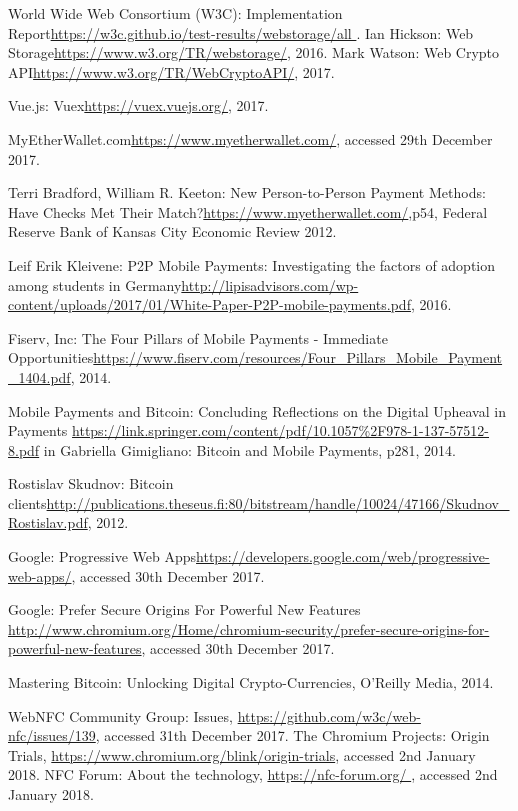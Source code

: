 \begin{thebibliography}{99}
 World Wide Web Consortium (W3C): Implementation Report\url{https://w3c.github.io/test-results/webstorage/all
}.
 Ian Hickson: Web Storage\url{https://www.w3.org/TR/webstorage/}, 2016.
 Mark Watson: Web Crypto API\url{https://www.w3.org/TR/WebCryptoAPI/}, 2017.

 Vue.js: Vuex\url{https://vuex.vuejs.org/}, 2017.

 MyEtherWallet.com\url{https://www.myetherwallet.com/}, accessed 29th December 2017.

 Terri Bradford, William R. Keeton: New Person-to-Person
Payment Methods: Have Checks Met Their Match?\url{https://www.myetherwallet.com/},p54, Federal Reserve Bank of Kansas City Economic Review 2012.

 Leif Erik Kleivene: P2P Mobile Payments: Investigating the factors of adoption among students in Germany\url{http://lipisadvisors.com/wp-content/uploads/2017/01/White-Paper-P2P-mobile-payments.pdf}, 2016.

 Fiserv, Inc: The Four Pillars of Mobile Payments - Immediate Opportunities\url{https://www.fiserv.com/resources/Four_Pillars_Mobile_Payment_1404.pdf}, 2014.

Mobile Payments and Bitcoin: Concluding Reflections on the Digital Upheaval in Payments \url{https://link.springer.com/content/pdf/10.1057\%2F978-1-137-57512-8.pdf} in Gabriella Gimigliano: Bitcoin and Mobile Payments, p281, 2014.

Rostislav Skudnov: Bitcoin clients\url{http://publications.theseus.fi:80/bitstream/handle/10024/47166/Skudnov_Rostislav.pdf}, 2012.

Google: Progressive Web Apps\url{https://developers.google.com/web/progressive-web-apps/}, accessed 30th December 2017.

Google: Prefer Secure Origins For Powerful New Features \url{http://www.chromium.org/Home/chromium-security/prefer-secure-origins-for-powerful-new-features}, accessed 30th December 2017.

Mastering Bitcoin: Unlocking Digital Crypto-Currencies, O'Reilly Media, 2014.

WebNFC Community Group: Issues, \url{https://github.com/w3c/web-nfc/issues/139}, accessed 31th December 2017.
The Chromium Projects: Origin Trials, \url{https://www.chromium.org/blink/origin-trials}, accessed 2nd January 2018.
NFC Forum: About the technology, \url{https://nfc-forum.org/
}, accessed 2nd January 2018.


\end{thebibliography}
